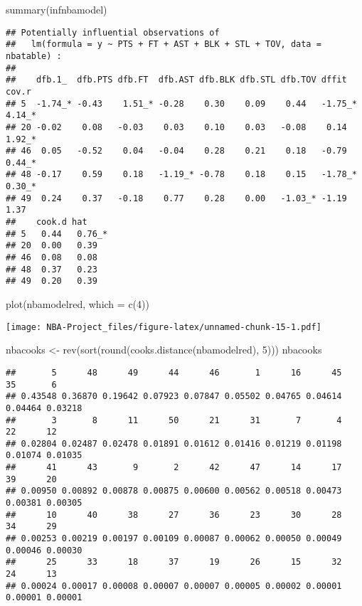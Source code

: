 \documentclass[
]{article}
\newenvironment{Shaded}{\begin{snugshade}}{\end{snugshade}}
\newcommand{\AttributeTok}[1]{\textcolor[rgb]{0.77,0.63,0.00}{#1}}
\newcommand{\DecValTok}[1]{\textcolor[rgb]{0.00,0.00,0.81}{#1}}
\newcommand{\FunctionTok}[1]{\textcolor[rgb]{0.00,0.00,0.00}{#1}}
\newcommand{\NormalTok}[1]{#1}
\newcommand{\OtherTok}[1]{\textcolor[rgb]{0.56,0.35,0.01}{#1}}
\begin{document}
\begin{Shaded}
\begin{Highlighting}[]
\FunctionTok{summary}\NormalTok{(infnbamodel)}
\end{Highlighting}
\end{Shaded}

\begin{verbatim}
## Potentially influential observations of
##   lm(formula = y ~ PTS + FT + AST + BLK + STL + TOV, data = nbatable) :
## 
##    dfb.1_  dfb.PTS dfb.FT  dfb.AST dfb.BLK dfb.STL dfb.TOV dffit   cov.r  
## 5  -1.74_* -0.43    1.51_* -0.28    0.30    0.09    0.44   -1.75_*  4.14_*
## 20 -0.02    0.08   -0.03    0.03    0.10    0.03   -0.08    0.14    1.92_*
## 46  0.05   -0.52    0.04   -0.04    0.28    0.21    0.18   -0.79    0.44_*
## 48 -0.17    0.59    0.18   -1.19_* -0.78    0.18    0.15   -1.78_*  0.30_*
## 49  0.24    0.37   -0.18    0.77    0.28    0.00   -1.03_* -1.19    1.37  
##    cook.d hat    
## 5   0.44   0.76_*
## 20  0.00   0.39  
## 46  0.08   0.08  
## 48  0.37   0.23  
## 49  0.20   0.39
\end{verbatim}

\begin{Shaded}
\begin{Highlighting}[]
\FunctionTok{plot}\NormalTok{(nbamodelred, }\AttributeTok{which =} \FunctionTok{c}\NormalTok{(}\DecValTok{4}\NormalTok{))}
\end{Highlighting}
\end{Shaded}

\texttt{[image: NBA-Project\_files/figure-latex/unnamed-chunk-15-1.pdf]}

\begin{Shaded}
\begin{Highlighting}[]
\NormalTok{nbacooks }\OtherTok{\textless{}{-}} \FunctionTok{rev}\NormalTok{(}\FunctionTok{sort}\NormalTok{(}\FunctionTok{round}\NormalTok{(}\FunctionTok{cooks.distance}\NormalTok{(nbamodelred), }\DecValTok{5}\NormalTok{)))}
\NormalTok{nbacooks}
\end{Highlighting}
\end{Shaded}

\begin{verbatim}
##       5      48      49      44      46       1      16      45      35       6 
## 0.43548 0.36870 0.19642 0.07923 0.07847 0.05502 0.04765 0.04614 0.04464 0.03218 
##       3       8      11      50      21      31       7       4      22      12 
## 0.02804 0.02487 0.02478 0.01891 0.01612 0.01416 0.01219 0.01198 0.01074 0.01035 
##      41      43       9       2      42      47      14      17      39      20 
## 0.00950 0.00892 0.00878 0.00875 0.00600 0.00562 0.00518 0.00473 0.00381 0.00305 
##      10      40      38      27      36      23      30      28      34      29 
## 0.00253 0.00219 0.00197 0.00109 0.00087 0.00062 0.00050 0.00049 0.00046 0.00030 
##      25      33      18      37      19      26      15      32      24      13 
## 0.00024 0.00017 0.00008 0.00007 0.00007 0.00005 0.00002 0.00001 0.00001 0.00001
\end{verbatim}
\end{document}
